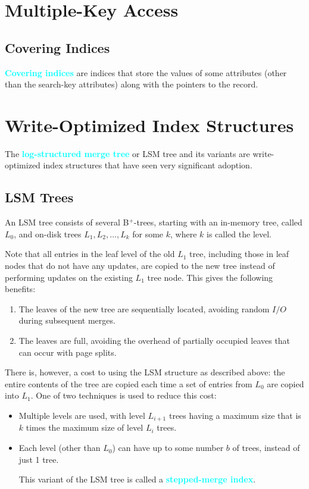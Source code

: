 \documentclass[a4paper,12pt,twoside,openany]{book}
\newcommand{\textcy}[1]{\textbf{\textcolor{cyan}{#1}}}
\begin{document}
\section{Multiple-Key Access}
\subsection{Covering Indices}

\textcy{Covering indices} are indices that store the values of some attributes (other than the search-key attributes) along with the pointers to the record.

\section{Write-Optimized Index Structures}

The \textcy{log-structured merge tree} or LSM tree and its variants are write-optimized index structures that have seen very significant adoption.

\subsection{LSM Trees}

An LSM tree consists of several B$^+$-trees, starting with an in-memory tree, called $L_0$, and on-disk trees $L_1,L_2,\ldots,L_k$ for some $k$, where $k$ is called the level.

Note that all entries in the leaf level of the old $L_1$ tree, including those in leaf nodes that do not have any updates, are copied to the new tree instead of performing updates on the existing $L_1$ tree node. This gives the following benefits:
\begin{enumerate}
    \item The leaves of the new tree are sequentially located, avoiding random $I/O$ during subsequent merges.
    \item The leaves are full, avoiding the overhead of partially occupied leaves that can occur with page splits.
\end{enumerate}
There is, however, a cost to using the LSM structure as described above: the entire contents of the tree are copied each time a set of entries from $L_0$ are copied into $L_1$. One of two techniques is used to reduce this cost:
\begin{itemize}
    \item Multiple levels are used, with level $L_{i+1}$ trees having a maximum size that is $k$ times the maximum size of level $L_i$ trees.
    \item Each level (other than $L_0$) can have up to some number $b$ of trees, instead of just 1 tree.
    
    This variant of the LSM tree is called a \textcy{stepped-merge index}.
\end{itemize}
\end{document}
